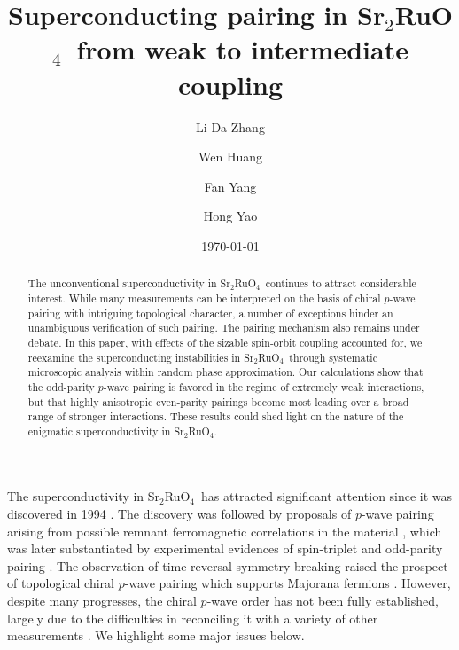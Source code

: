 \documentclass[aps,prl,twocolumn,superscriptaddress,showpacs]{revtex4-1}
\newcommand{\SRO}{Sr$_2$RuO$_4$}
\begin{document}
\title{Superconducting pairing in \SRO~from weak to intermediate coupling}
\author{Li-Da Zhang}
\address{School of Physics, Beijing Institute of Technology, Beijing 100081, China}

\author{Wen Huang}
 \address{Institute for Advanced Study, Tsinghua University, Beijing 100084, China}

\author{Fan Yang}
\address{School of Physics, Beijing Institute of Technology, Beijing 100081, China}

\author{Hong Yao}
\date{\today}

\begin{abstract}
The unconventional superconductivity in \SRO~continues to attract considerable interest. While many measurements can be interpreted on the basis of chiral $p$-wave pairing with intriguing topological character, a number of exceptions hinder an unambiguous verification of such pairing. The pairing mechanism also remains under debate. In this paper, with effects of the sizable spin-orbit coupling accounted for, we reexamine the superconducting instabilities in \SRO~through systematic microscopic analysis within random phase approximation. Our calculations show that the odd-parity $p$-wave pairing is favored in the regime of extremely weak interactions, but that highly anisotropic even-parity pairings become most leading over a broad range of stronger interactions. These results could shed light on the nature of the enigmatic superconductivity in \SRO.
\end{abstract}


\maketitle
The superconductivity in \SRO~has attracted significant attention since it was discovered in 1994 \cite{Maeno:94,Maeno:01,Mackenzie:03}. The discovery was followed by proposals of $p$-wave pairing arising from possible remnant ferromagnetic correlations in the material \cite{Rice:95,Baskaran:96,Cuoco:98}, which was later substantiated by experimental evidences of spin-triplet and odd-parity pairing \cite{Ishida:98,Duffy:00,Nelson:04,Ishida:15,Manago:16}. The observation of time-reversal symmetry breaking \cite{Luke:98,Xia:06} raised the prospect of topological chiral $p$-wave pairing which supports Majorana fermions \cite{Kopnin:91,Read:00}. However, despite many progresses, the chiral $p$-wave order has not been fully established, largely due to the difficulties in reconciling it with a variety of other measurements \cite{Kallin:09,Maeno:12,Kallin:12,Mackenzie:17}. We highlight some major issues below. 
\end{document}
